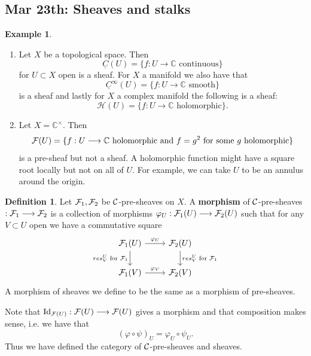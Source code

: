 \documentclass[11pt]{article}
\theoremstyle{definition}
\newtheorem{dfn}[thm]{Definition}
\newtheorem{ex}[thm]{Example}
\newcommand{\cplx}{\mathbb C}
\newcommand{\calf}{{\cal F}}
\newcommand{\calc}{{\cal C}}
\begin{document}
\subsection{Mar 23th: Sheaves and stalks}
\begin{ex}
    \begin{enumerate}[label=(\arabic*)]
        \item 
        Let $X$ be a topological space. Then
        $$
            \underline C(U) = \{ f : U \longrightarrow \mathbb C \text{ continuous}\}
        $$
        for $U\subset X$ open is a sheaf. For $X$ a manifold we also have that
        $$
        \underline C^\infty(U) = \{ f : U \longrightarrow \mathbb C \text{ smooth}\}
        $$
        is a sheaf and lastly for $X$ a complex manifold the following is a sheaf:
        $$
        \mathcal H(U) = \{ f : U \longrightarrow \cplx \text{ holomorphic}\}. 
        $$
        \item
        Let $X= \mathbb C^\times$. Then
        $$
        \calf(U) = \{f: U \longrightarrow \mathbb C \text{ holomorphic and } f= g^2 \text{ for some $g$ holomorphic} \}
        $$
        is a pre-sheaf but not a sheaf. A holomorphic function might have a square root locally but not on all of $U$. For example, we can take $U$ to be an annulus around the origin.
    \end{enumerate}
\end{ex}

\begin{dfn}
    Let $\calf_1, \calf_2$ be $\calc$-pre-sheaves on $X$. A \textbf{morphism} of $\calc$-pre-sheaves $ : \calf_1 \longrightarrow \calf_2$ is a collection of morphisms $\varphi_U: \calf_1(U) \longrightarrow \calf_2(U)$ such that for any $V\subset U$ open we have a commutative square
    $$
    \begin{tikzcd}
    \calf_1(U) \arrow[r, "\varphi_U"] \arrow[d, "res^U_V \text{ for } \calf_1"'] & \calf_2(U) \arrow[d, "res^U_V \text{ for } \calf_1"] \\
    \calf_1(V) \arrow[r, "\varphi_V"] & \calf_2(V)
    \end{tikzcd}
    $$
    A morphism of sheaves we define to be the same as a morphism of pre-sheaves.
\end{dfn}
Note that $\operatorname{Id}_{\calf(U)}: \calf(U) \longrightarrow \calf(U)$ gives a morphism and that composition makes sense, i.e. we have that
$$
(\varphi \circ \psi)_U = \varphi_U \circ \psi_U.
$$ 
Thus we have defined the category of $\calc$-pre-sheaves and sheaves.
\end{document}
